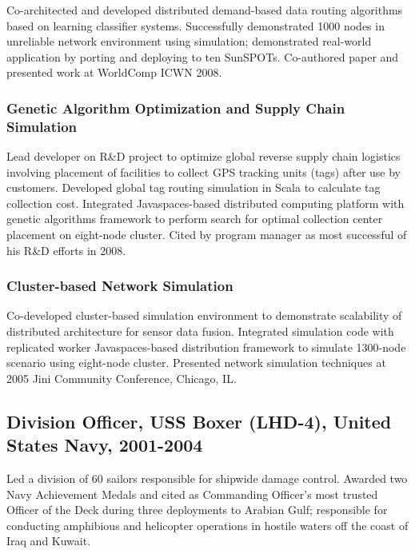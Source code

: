 \documentclass[11pt]{article}
\begin{document}
    Co-architected and developed distributed demand-based data routing
    algorithms based on learning classifier systems.  Successfully
    demonstrated 1000 nodes in unreliable network environment using
    simulation; demonstrated real-world application by porting and
    deploying to ten SunSPOTs. Co-authored paper and presented work at
    WorldComp ICWN 2008.
      
\subsubsection*{Genetic Algorithm Optimization and Supply Chain Simulation}
\label{sec-1_1_5}

    Lead developer on R\&D project to optimize global reverse supply
    chain logistics involving placement of facilities to collect GPS
    tracking units (tags) after use by customers.  Developed global tag
    routing simulation in Scala to calculate tag collection cost.
    Integrated Javaspaces-based distributed computing platform with
    genetic algorithms framework to perform search for optimal
    collection center placement on eight-node cluster. Cited by program
    manager as most successful of his R\&D efforts in 2008.
      
\subsubsection*{Cluster-based Network Simulation}
\label{sec-1_1_6}

    Co-developed cluster-based simulation environment to demonstrate
    scalability of distributed architecture for sensor data fusion.
    Integrated simulation code with replicated worker Javaspaces-based
    distribution framework to simulate 1300-node scenario using
    eight-node cluster. Presented network simulation techniques at 2005
    Jini Community Conference, Chicago, IL.
\subsection*{Division Officer, USS Boxer (LHD-4), United States Navy, 2001-2004}
\label{sec-1_2}

    Led a division of 60 sailors responsible for shipwide damage
    control.  Awarded two Navy Achievement Medals and cited as
    Commanding Officer's most trusted Officer of the Deck during three
    deployments to Arabian Gulf; responsible for conducting amphibious
    and helicopter operations in hostile waters off the coast of Iraq
    and Kuwait.
\end{document}
